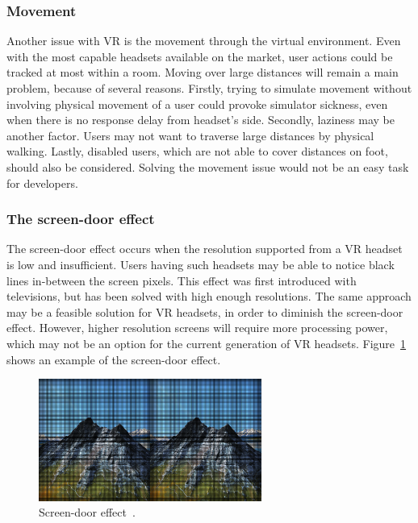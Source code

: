\documentclass[12pt]{article}
\begin{document}
\subsubsection{Movement} \label{sec:Movement}
Another issue with \ac{VR} is the movement through the virtual environment. Even with the most capable headsets available on the market, user actions could be tracked at most within a room. Moving over large distances will remain a main problem, because of several reasons. Firstly, trying to simulate movement without involving physical movement of a user could provoke simulator sickness, even when there is no response delay from headset's side. Secondly, laziness may be another factor. Users may not want to traverse large distances by physical walking. Lastly, disabled users, which are not able to cover distances on foot, should also be considered. Solving the movement issue would not be an easy task for developers.

\subsubsection{The screen-door effect} \label{sec:The screen-door effect}
The screen-door effect occurs when the resolution supported from a \ac{VR} headset is low and insufficient. Users having such headsets may be able to notice black lines in-between the screen pixels. This effect was first introduced with televisions, but has been solved with high enough resolutions. The same approach may be a feasible solution for \ac{VR} headsets, in order to diminish the screen-door effect. However, higher resolution screens will require more processing power, which may not be an option for the current generation of \ac{VR} headsets. Figure~\ref{fig:screen_door} shows an example of the screen-door effect.

\begin{figure} [ht]
    \centering
    \includegraphics[width=0.65\textwidth]{../images/screen-door.png}
    \caption{Screen-door effect~\cite{dummies}.}
    \label{fig:screen_door}
\end{figure}
\end{document}
